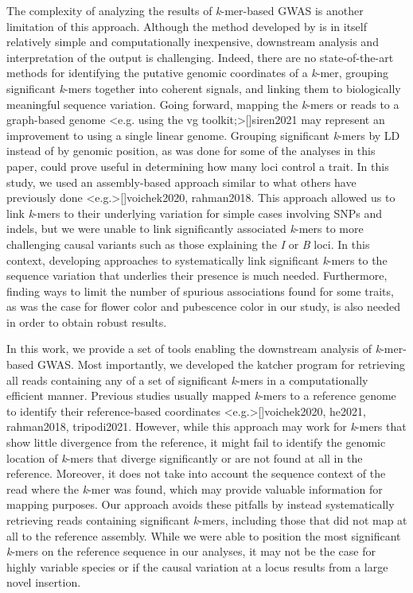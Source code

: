 \documentclass{article}
\begin{document}
The complexity of analyzing the results of \emph{k}-mer-based GWAS is another
limitation of this approach. Although the method developed by
 is in itself relatively simple and computationally
inexpensive, downstream analysis and interpretation of the output is
challenging. Indeed, there are no state-of-the-art methods for identifying the
putative genomic coordinates of a \emph{k}-mer, grouping significant
\emph{k}-mers together into coherent signals, and linking them to biologically
meaningful sequence variation. Going forward, mapping the \emph{k}-mers or
reads to a graph-based genome \shortcite<e.g. using the vg toolkit;>[]{siren2021}
may represent an improvement to using a single linear genome.  Grouping
significant \emph{k}-mers by LD instead of by genomic position, as was done for
some of the analyses in this paper, could prove useful in determining how many
loci control a trait. In this study, we used an assembly-based approach similar
to what others have previously done \shortcite<e.g.>[]{voichek2020, rahman2018}.
This approach allowed us to link \emph{k}-mers to their underlying variation
for simple cases involving SNPs and indels, but we were unable to link
significantly associated \emph{k}-mers to more challenging causal variants such
as those explaining the \emph{I} or \emph{B} loci. In this context, developing
approaches to systematically link significant \emph{k}-mers to the sequence
variation that underlies their presence is much needed. Furthermore, finding
ways to limit the number of spurious associations found for some traits, as was
the case for flower color and pubescence color in our study, is also needed in
order to obtain robust results.

In this work, we provide a set of tools enabling the downstream analysis of
\emph{k}-mer-based GWAS. Most importantly, we developed the katcher program for
retrieving all reads containing any of a set of significant \emph{k}-mers in a
computationally efficient manner. Previous studies usually mapped \emph{k}-mers
to a reference genome to identify their reference-based coordinates
\shortcite<e.g.>[]{voichek2020, he2021, rahman2018, tripodi2021}.  However, while
this approach may work for \emph{k}-mers that show little divergence from the
reference, it might fail to identify the genomic location of \emph{k}-mers that
diverge significantly or are not found at all in the reference. Moreover, it
does not take into account the sequence context of the read where the
\emph{k}-mer was found, which may provide valuable information for mapping
purposes. Our approach avoids these pitfalls by instead systematically
retrieving reads containing significant \emph{k}-mers, including those that did
not map at all to the reference assembly. While we were able to position the
most significant \emph{k}-mers on the reference sequence in our analyses, it
may not be the case for highly variable species or if the causal variation at a
locus results from a large novel insertion.
\end{document}
